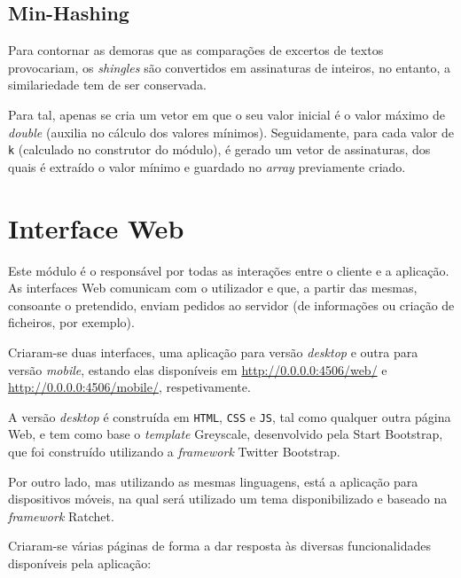 \documentclass[a4paper,11pt,openright,oneside]{report}
\begin{document}
\subsection{Min-Hashing}
\label{subsec.minhash}

Para contornar as demoras que as comparações de excertos de textos provocariam, os \textit{shingles} são convertidos em assinaturas de inteiros, no entanto, a similariedade tem de ser conservada.

Para tal, apenas se cria um vetor em que o seu valor inicial é o valor máximo de \textit{double} (auxilia no cálculo dos valores mínimos). Seguidamente, para cada valor de \texttt{k} (calculado no construtor do módulo), é gerado um vetor de assinaturas, dos quais é extraído o valor mínimo e guardado no \textit{array} previamente criado.

\iffalse





\section{Interface Web}
\label{sec.web}

Este módulo é o responsável por todas as interações entre o cliente e a aplicação. As interfaces Web comunicam com o utilizador e que, a partir das mesmas, consoante o pretendido, enviam pedidos ao servidor (de informações ou criação de ficheiros, por exemplo).

Criaram-se duas interfaces, uma aplicação para versão \textit{desktop} e outra para versão \textit{mobile}, estando elas disponíveis em \url{http://0.0.0.0:4506/web/} e \url{http://0.0.0.0:4506/mobile/}, respetivamente.

A versão \textit{desktop} é construída em \verb|HTML|, \verb|CSS| e \verb|JS|, tal como qualquer outra página Web, e tem como base o \textit{template} Greyscale, desenvolvido pela Start Bootstrap, que foi construído utilizando a \textit{framework} Twitter Bootstrap.

Por outro lado, mas utilizando as mesmas linguagens, está a aplicação para dispositivos móveis, na qual será utilizado um tema disponibilizado e baseado na \textit{framework} Ratchet.

Criaram-se várias páginas de forma a dar resposta às diversas funcionalidades disponíveis pela aplicação:
\end{document}
